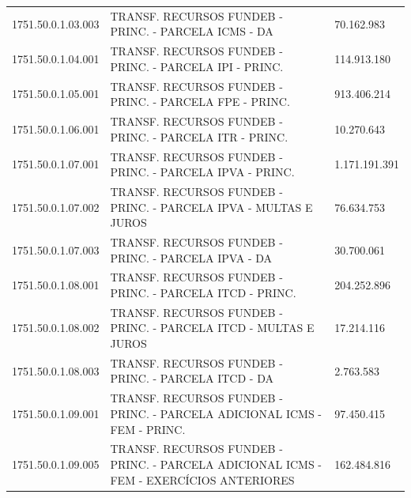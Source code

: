 \documentclass{article}
\begin{document}
\begin{longtable}[c]{m{2.5cm}|m{14cm}|m{1.5cm}}
\multicolumn{1}{L{2.5cm}|}{1751.50.0.1.03.003} & \multicolumn{1}{L{14cm}|}{TRANSF. RECURSOS FUNDEB - PRINC. - PARCELA ICMS - DA} & \multicolumn{1}{R{1.5cm}}{70.162.983} \\
\multicolumn{1}{L{2.5cm}|}{1751.50.0.1.04.001} & \multicolumn{1}{L{14cm}|}{TRANSF. RECURSOS FUNDEB - PRINC. - PARCELA IPI - PRINC.} & \multicolumn{1}{R{1.5cm}}{114.913.180} \\
\multicolumn{1}{L{2.5cm}|}{1751.50.0.1.05.001} & \multicolumn{1}{L{14cm}|}{TRANSF. RECURSOS FUNDEB - PRINC. - PARCELA FPE - PRINC.} & \multicolumn{1}{R{1.5cm}}{913.406.214} \\
\multicolumn{1}{L{2.5cm}|}{1751.50.0.1.06.001} & \multicolumn{1}{L{14cm}|}{TRANSF. RECURSOS FUNDEB - PRINC. - PARCELA ITR - PRINC.} & \multicolumn{1}{R{1.5cm}}{10.270.643} \\
\multicolumn{1}{L{2.5cm}|}{1751.50.0.1.07.001} & \multicolumn{1}{L{14cm}|}{TRANSF. RECURSOS FUNDEB - PRINC. - PARCELA IPVA - PRINC.} & \multicolumn{1}{R{1.5cm}}{1.171.191.391} \\
\multicolumn{1}{L{2.5cm}|}{1751.50.0.1.07.002} & \multicolumn{1}{L{14cm}|}{TRANSF. RECURSOS FUNDEB - PRINC. - PARCELA IPVA - MULTAS E JUROS} & \multicolumn{1}{R{1.5cm}}{76.634.753} \\
\multicolumn{1}{L{2.5cm}|}{1751.50.0.1.07.003} & \multicolumn{1}{L{14cm}|}{TRANSF. RECURSOS FUNDEB - PRINC. - PARCELA IPVA - DA} & \multicolumn{1}{R{1.5cm}}{30.700.061} \\
\multicolumn{1}{L{2.5cm}|}{1751.50.0.1.08.001} & \multicolumn{1}{L{14cm}|}{TRANSF. RECURSOS FUNDEB - PRINC. - PARCELA ITCD - PRINC.} & \multicolumn{1}{R{1.5cm}}{204.252.896} \\
\multicolumn{1}{L{2.5cm}|}{1751.50.0.1.08.002} & \multicolumn{1}{L{14cm}|}{TRANSF. RECURSOS FUNDEB - PRINC. - PARCELA ITCD - MULTAS E JUROS} & \multicolumn{1}{R{1.5cm}}{17.214.116} \\
\multicolumn{1}{L{2.5cm}|}{1751.50.0.1.08.003} & \multicolumn{1}{L{14cm}|}{TRANSF. RECURSOS FUNDEB - PRINC. - PARCELA ITCD - DA} & \multicolumn{1}{R{1.5cm}}{2.763.583} \\
\multicolumn{1}{L{2.5cm}|}{1751.50.0.1.09.001} & \multicolumn{1}{L{14cm}|}{TRANSF. RECURSOS FUNDEB - PRINC. - PARCELA ADICIONAL ICMS - FEM - PRINC.} & \multicolumn{1}{R{1.5cm}}{97.450.415} \\
\multicolumn{1}{L{2.5cm}|}{1751.50.0.1.09.005} & \multicolumn{1}{L{14cm}|}{TRANSF. RECURSOS FUNDEB - PRINC. - PARCELA ADICIONAL ICMS - FEM - EXERCÍCIOS ANTERIORES} & \multicolumn{1}{R{1.5cm}}{162.484.816} \\

\end{longtable}
\end{document}
